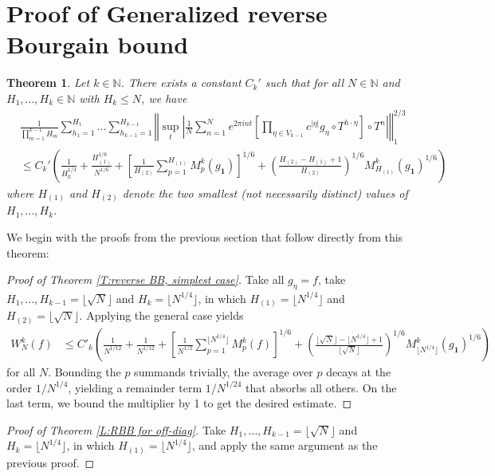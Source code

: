 \documentclass[11pt, oneside]{amsart}   	%
\newcommand{\1}{\mathbbm{1}}
\newcommand{\N}{\mathbb{N}}
\newcommand{\floor}[1]{\lfloor#1\rfloor}
\newtheorem{theorem}{Theorem}[section]
\theoremstyle{definition}
\begin{document}
\appendix
\section{Proof of Generalized reverse Bourgain bound}\label{A:general case}

\begin{theorem}\label{T:general case}
Let $k\in \N$. There exists a constant $C_k'$ such that for all $N\in \N$ and $H_1, \dots, H_k \in \N$ with $H_k \leq N$, we have
\begin{align*}
&\frac{1}{\prod_{m=1}^{k-1} H_m} \sum_{h_1 = 1}^{H_1} \dots \sum_{h_{k-1}=1}^{H_{k-1}} \left\Vert\sup_t \left| \frac{1}{N} \sum_{n=1}^N e^{2\pi i n t} \left[ \prod_{\eta \in V_{k-1}} c^{|\eta|} g_\eta \circ T^{h \cdot \eta}\right] \circ T^n\right| \right\Vert_1^{2/3} \\ &\leq C_k' \left(\frac{1}{H_k^{1/3}} + \frac{H_{(1)}^{1/6}}{N^{1/6}} + \left[\frac{1}{H_{(2)}}\sum_{p=1}^{H_{(1)}} M_p^k (g_\mathbf{1}) \right]^{1/6} + \left(\frac{H_{(2)} - H_{(1)} + 1}{H_{(2)}}\right)^{1/6} M_{H_{(1)}}^k (g_\mathbf{1})^{1/6} \right)
\end{align*}
where $H_{(1)}$ and $H_{(2)}$ denote the two smallest (not necessarily distinct) values of $H_1, \dots, H_k$.
\end{theorem}

We begin with the proofs from the previous section that follow directly from this theorem:

\begin{proof}[Proof of Theorem \ref{T:reverse BB, simplest case}]
Take all $g_\eta = f$, take $H_1, \dots, H_{k-1} = \floor{\sqrt{N}}$ and $H_k = \floor{N^{1/4}}$, in which $H_{(1)} = \floor{N^{1/4}}$ and $H_{(2)} = \floor{\sqrt{N}}$. Applying the general case yields
\begin{align*}
W_N^k(f) &\leq C'_k\left( \frac{1}{N^{1/12}} + \frac{1}{N^{1/12}} + \left[\frac{1}{N^{1/2}} \sum_{p=1}^{\floor{N^{1/4}}} M_p^k(f)\right]^{1/6} + \left(\frac{\floor{\sqrt{N}} - \floor{N^{1/4}} + 1}{\floor{\sqrt{N}}}\right)^{1/6} M_{\floor{N^{1/4}}}^k (g_\mathbf{1})^{1/6} \right)
\end{align*}
for all $N$. Bounding the $p$ summands trivially, the average over $p$ decays at the order $1 / N^{1/4}$, yielding a remainder term $1/N^{1/24}$ that absorbs all others. On the last term, we bound the multiplier by 1 to get the desired estimate.
\end{proof}

\begin{proof}[Proof of Theorem \ref{L:RBB for off-diag}]
Take $H_1, \dots, H_{k-1} = \floor{\sqrt{N}}$ and $H_k = \floor{N^{1/4}}$, in which $H_{(1)} = \floor{N^{1/4}}$, and apply the same argument as the previous proof.
\end{proof}
\end{document}
